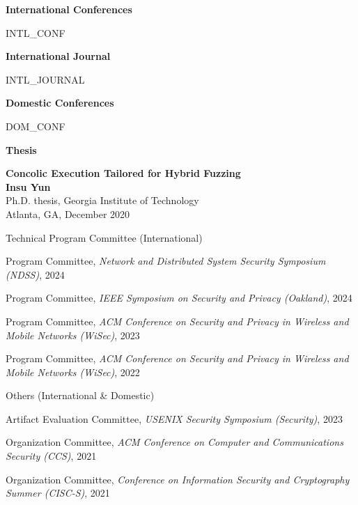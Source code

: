 \documentclass[11pt,letterpaper]{article}
\begin{document}
%
%


\textbf{International Conferences }
\begin{etaremune}
  {{ INTL_CONF }}
\end{etaremune}

\textbf{International Journal}
\begin{etaremune}
  {{ INTL_JOURNAL }}
\end{etaremune}

\textbf{Domestic Conferences}
\begin{etaremune}
  {{ DOM_CONF }}
\end{etaremune}

\textbf{Thesis}
\begin{etaremune}
\item \textbf{Concolic Execution Tailored for Hybrid Fuzzing}  \\
{\footnotesize
  \textbf{Insu Yun} \\
  Ph.D. thesis, Georgia Institute of Technology \\
Atlanta, GA, December 2020
}
\end{etaremune}

\pagebreak

\begin{topic}{Technical Program Committee (International)}{}
  \item{Program Committee, \emph{Network and Distributed System Security Symposium (NDSS)}, 2024}
  \item{Program Committee, \emph{IEEE Symposium on Security and Privacy (Oakland)}, 2024}
  \item{Program Committee, \emph{ACM Conference on Security and Privacy in Wireless and Mobile Networks (WiSec)}, 2023}
  \item{Program Committee, \emph{ACM Conference on Security and Privacy in Wireless and Mobile Networks (WiSec)}, 2022}
\end{topic}

\begin{topic}{Others (International \& Domestic)}{}
  \item{Artifact Evaluation Committee, \emph{USENIX Security Symposium (Security)}, 2023}
  \item{Organization Committee, \emph{ACM Conference on Computer and Communications Security (CCS)}, 2021}
  \item{Organization Committee, \emph{Conference on Information Security and Cryptography Summer (CISC-S)}, 2021}
\end{topic}
\end{document}
